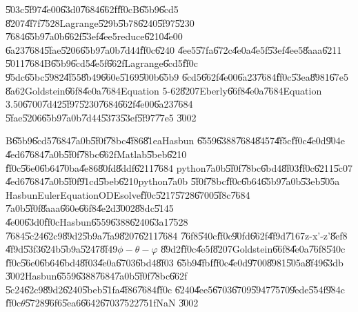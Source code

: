\documentclass[12pt,a4paper]{article}
\begin{document}
\bigskip

\U{503c}\U{5f97}\U{4e00}\U{63d0}\U{7684}\U{662f}\U{ff0c}B\U{65b9}\U{6cd5}%
\U{8207}\U{4f7f}\U{7528}Lagrange\U{529b}\U{5b78}\U{6240}\U{5f97}\U{5230}%
\U{7684}\U{65b9}\U{7a0b}\U{662f}\U{53ef}\U{4ee5}reduce\U{6210}\U{4e00}%
\U{6a23}\U{7684}\U{5fae}\U{5206}\U{65b9}\U{7a0b}\U{7d44}\U{ff0c}\U{6240}%
\U{4ee5}\U{57fa}\U{672c}\U{4e0a}\U{4e5f}\U{53ef}\U{4ee5}\U{8aaa}\U{6211}%
\U{5011}\U{7684}B\U{65b9}\U{6cd5}\U{4e5f}\U{662f}Lagrange\U{6cd5}\U{ff0c}%
\U{95dc}\U{65bc}\U{5982}\U{4f55}\U{8b49}\U{660e}\U{5169}\U{500b}\U{65b9}%
\U{6cd5}\U{662f}\U{4e00}\U{6a23}\U{7684}\U{ff0c}\U{53ea}\U{8981}\U{67e5}%
\U{8a62}Goldstein\U{66f8}\U{4e0a}\cite[Page 216]{goldstein}\U{7684}Equation
5-62\U{8207}Eberly\U{66f8}\U{4e0a}\cite[Page 158]{eberly}\U{7684}Equation
3.50\U{6700}\U{7d42}\U{5f97}\U{5230}\U{7684}\U{662f}\U{4e00}\U{6a23}\U{7684}%
\U{5fae}\U{5206}\U{65b9}\U{7a0b}\U{7d44}\U{5373}\U{53ef}\U{5f97}\U{77e5}%
\U{3002}

\bigskip

B\U{65b9}\U{6cd5}\U{7684}\U{7a0b}\U{5f0f}\U{78bc}\U{4f86}\U{81ea}Hasbun%
\U{6559}\U{6388}\U{7684}\U{8457}\U{4f5c}\cite{hasbun}\U{ff0c}\U{4e0d}\U{904e}%
\U{4ed6}\U{7684}\U{7a0b}\U{5f0f}\U{78bc}\U{662f}Matlab\U{5beb}\U{6210}%
\U{ff0c}\U{56e0}\U{6b64}\U{70ba}\U{4e86}\U{80fd}\U{8ddf}\U{6211}\U{7684}%
python\U{7a0b}\U{5f0f}\U{78bc}\U{6bd4}\U{8f03}\U{ff0c}\U{6211}\U{5c07}%
\U{4ed6}\U{7684}\U{7a0b}\U{5f0f}\U{91cd}\U{5beb}\U{6210}python\U{7a0b}%
\U{5f0f}\U{78bc}\U{ff0c}\U{6b64}\U{65b9}\U{7a0b}\U{53eb}\U{505a}%
HasbunEulerEquationODEsolve\U{ff0c}\U{5217}\U{5728}\U{6700}\U{5f8c}\U{7684}%
\U{7a0b}\U{5f0f}\U{8aaa}\U{660e}\U{66f8}\U{4e2d}\U{3002}\U{88dc}\U{5145}%
\U{4e00}\U{63d0}\U{ff0c}Hasbun\U{6559}\U{6388}\U{6240}\U{63a1}\U{7528}%
\U{7684}\U{5c24}\U{62c9}\U{89d2}\U{5b9a}\U{7fa9}\U{8207}\U{6211}\U{7684}%
\U{76f8}\U{540c}\U{ff0c}\U{90fd}\U{662f}\U{4f9d}\U{7167}z-x'-z'\U{8ef8}%
\U{4f9d}\U{53f3}\U{624b}\U{5b9a}\U{5247}\U{8f49}$\phi -\theta -\varphi $%
\U{89d2}\U{ff0c}\U{4e5f}\U{8207}Goldstein\U{66f8}\U{4e0a}\U{76f8}\U{540c}%
\U{ff0c}\U{56e0}\U{6b64}\U{6bd4}\U{8f03}\U{4e0a}\U{6703}\U{6bd4}\U{8f03}%
\U{65b9}\U{4fbf}\U{ff0c}\U{4e0d}\U{9700}\U{8981}\U{505a}\U{8f49}\U{63db}%
\U{3002}Hasbun\U{6559}\U{6388}\U{7684}\U{7a0b}\U{5f0f}\U{78bc}\U{662f}%
\U{5c24}\U{62c9}\U{89d2}\U{6240}\U{5beb}\U{51fa}\U{4f86}\U{7684}\U{ff0c}%
\U{6240}\U{4ee5}\U{6703}\U{6709}\U{5947}\U{7570}\U{9ede}\U{554f}\U{984c}%
\U{ff0c}$\theta $\U{5728}\U{96f6}\U{5ea6}\U{6642}\U{6703}\U{7522}\U{751f}NaN%
\U{3002}

\bigskip
\end{document}
